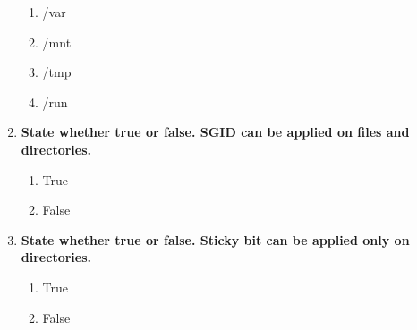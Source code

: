 \begin{flushleft}
\begin{enumerate}
\begin{enumerate}[label=(\alph*)]
			\item /var
			\item /mnt   
			\item /tmp     %
			\item /run
		\end{enumerate}
		\bigskip
		\bigskip
		\item \textbf{State whether true or false. SGID can be applied on files and directories.}
		\begin{enumerate}[label=(\alph*)]
			\item True
			\item False  %
		\end{enumerate}
		\bigskip
		\bigskip
		\item \textbf{State whether true or false. Sticky bit can be applied only on directories.}
		\begin{enumerate}[label=(\alph*)]
			\item True %
			\item False
		\end{enumerate}
	\end{enumerate}

	
\end{flushleft}

\newpage

